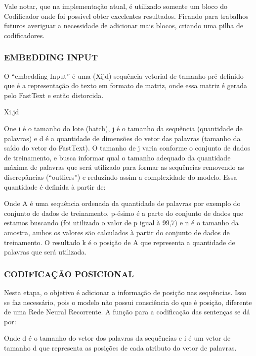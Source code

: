 Vale notar, que na implementação atual, é utilizado somente um bloco do Codificador onde foi possível obter excelentes resultados. Ficando para trabalhos futuros averiguar a necessidade de adicionar mais blocos, criando uma pilha de codificadores.

\subsubsection{EMBEDDING INPUT}

O “embedding Input” é uma (Xijd) sequência vetorial de tamanho pré-definido que é a representação do texto em formato de matriz, onde essa matriz é gerada pelo FastText e então distorcida.

Xi,jd

One i é o tamanho do lote (batch), j é o tamanho da sequência (quantidade de palavras) e d é a quantidade de dimensões do vetor das palavras (tamanho da saído do vetor do FastText). 
    O tamanho de j varia conforme o conjunto de dados de treinamento, e busca informar qual o tamanho adequado da quantidade máxima de palavras que será utilizado para formar as sequências removendo as discrepâncias (“outliers”) e reduzindo assim a complexidade do modelo. Essa quantidade é definida à partir de:


Onde A é uma sequência ordenada da quantidade de palavras por exemplo do conjunto de dados de treinamento,  p-ésimo é a parte  do conjunto de dados que estamos buscando (foi utilizado o valor de p igual à 99,7) e n é o tamanho da amostra, ambos os valores são calculados à partir do conjunto de dados de treinamento. O resultado k é o posição de A que representa a quantidade de palavras que será utilizada.

\subsubsection{CODIFICAÇÃO POSICIONAL}

Nesta etapa, o objetivo é adicionar a informação de posição nas sequências. Isso se faz necessário, pois o modelo não possui consciência do que é posição, diferente de uma Rede Neural Recorrente. A função para a codificação das sentenças se dá por:

Onde d é o tamanho do vetor dos palavras da sequências e i é um vetor de tamanho d que representa as posições de cada atributo do vetor de palavras.

